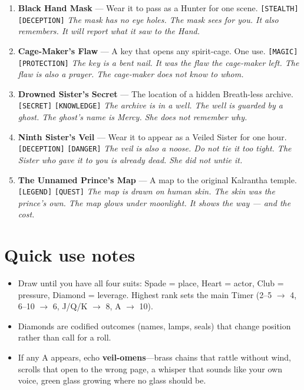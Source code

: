 \begin{enumerate}
\item \textbf{Black Hand Mask} --- Wear it to pass as a Hunter for one scene. \texttt{[STEALTH]} \texttt{[DECEPTION]}
  \hfill \textit{The mask has no eye holes. The mask sees for you. It also remembers. It will report what it saw to the Hand.}
\item[J] \textbf{Cage-Maker's Flaw} --- A key that opens any spirit-cage. One use. \texttt{[MAGIC]} \texttt{[PROTECTION]}
  \hfill \textit{The key is a bent nail. It was the flaw the cage-maker left. The flaw is also a prayer. The cage-maker does not know to whom.}
\item[Q] \textbf{Drowned Sister's Secret} --- The location of a hidden Breath-less archive. \texttt{[SECRET]} \texttt{[KNOWLEDGE]}
  \hfill \textit{The archive is in a well. The well is guarded by a ghost. The ghost's name is Mercy. She does not remember why.}
\item[K] \textbf{Ninth Sister's Veil} --- Wear it to appear as a Veiled Sister for one hour. \texttt{[DECEPTION]} \texttt{[DANGER]}
  \hfill \textit{The veil is also a noose. Do not tie it too tight. The Sister who gave it to you is already dead. She did not untie it.}
\item[A] \textbf{The Unnamed Prince's Map} --- A map to the original Kalrantha temple. \texttt{[LEGEND]} \texttt{[QUEST]}
  \hfill \textit{The map is drawn on human skin. The skin was the prince's own. The map glows under moonlight. It shows the way --- and the cost.}
\end{enumerate}

\section*{Quick use notes}
\label{sec:ashaan-quick-use}
\begin{itemize}
\item Draw until you have all four suits: Spade = place, Heart = actor, Club = pressure, Diamond = leverage. Highest rank sets the main Timer (2--5 \(\rightarrow\) 4, 6--10 \(\rightarrow\) 6, J/Q/K \(\rightarrow\) 8, A \(\rightarrow\) 10).
\item Diamonds are codified outcomes (names, lamps, seals) that change position rather than call for a roll.
\item If any A appears, echo \textbf{veil-omens}---brass chains that rattle without wind, scrolls that open to the wrong page, a whisper that sounds like your own voice, green glass growing where no glass should be.
\end{itemize}


